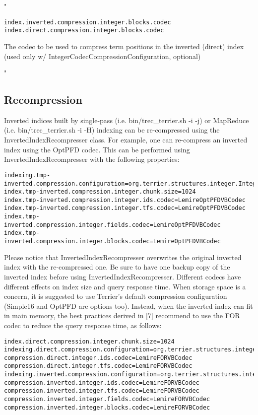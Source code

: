 "

\texttt{index.inverted.compression.integer.blocks.codec}\\
\texttt{index.direct.compression.integer.blocks.codec}

The codec to be used to compress term positions in the inverted (direct)
index (used only w/ IntegerCodecCompressionConfiguration, optional)

"

\subsection{Recompression}\label{recompression}

Inverted indices built by single-pass (i.e. bin/trec\_terrier.sh -i -j)
or MapReduce (i.e. bin/trec\_terrier.sh -i -H) indexing can be
re-compressed using the InvertedIndexRecompresser class. For example,
one can re-compress an inverted index using the OptPFD codec. This can
be performed using InvertedIndexRecompresser with the following
properties:

\begin{verbatim}
indexing.tmp-inverted.compression.configuration=org.terrier.structures.integer.IntegerCodecCompressionConfiguration
index.tmp-inverted.compression.integer.chunk.size=1024
index.tmp-inverted.compression.integer.ids.codec=LemireOptPFDVBCodec
index.tmp-inverted.compression.integer.tfs.codec=LemireOptPFDVBCodec
index.tmp-inverted.compression.integer.fields.codec=LemireOptPFDVBCodec
index.tmp-inverted.compression.integer.blocks.codec=LemireOptPFDVBCodec
\end{verbatim}

Please notice that InvertedIndexRecompresser overwrites the original
inverted index with the re-compressed one. Be sure to have one backup
copy of the inverted index before using InvertedIndexRecompresser.
Different codecs have different effects on index size and query response
time. When storage space is a concern, it is suggested to use Terrier's
default compression configuration (Simple16 and OptPFD are options too).
Instead, when the inverted index can fit in main memory, the best
practices derived in {[}7{]} recommend to use the FOR codec to reduce
the query response time, as follows:

\begin{verbatim}
index.direct.compression.integer.chunk.size=1024
indexing.direct.compression.configuration=org.terrier.structures.integer.IntegerCodecCompressionConfiguration
compression.direct.integer.ids.codec=LemireFORVBCodec
compression.direct.integer.tfs.codec=LemireFORVBCodec
indexing.inverted.compression.configuration=org.terrier.structures.integer.IntegerCodecCompressionConfiguration
compression.inverted.integer.ids.codec=LemireFORVBCodec
compression.inverted.integer.tfs.codec=LemireFORVBCodec
compression.inverted.integer.fields.codec=LemireFORVBCodec
compression.inverted.integer.blocks.codec=LemireFORVBCodec
\end{verbatim}

